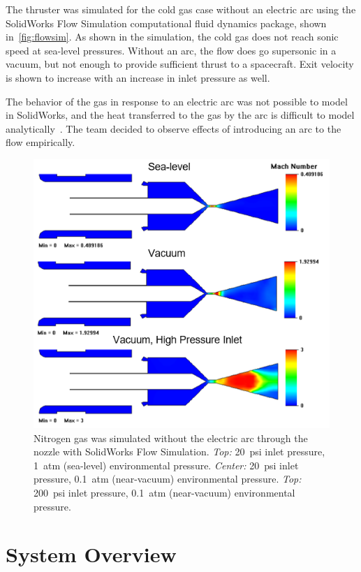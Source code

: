 \documentclass[conference]{IEEEtran}
\begin{document}
The thruster was simulated for the cold gas case without an electric arc using the SolidWorks Flow Simulation computational fluid dynamics package, shown in~\autoref{fig:flowsim}.
As shown in the simulation, the cold gas does not reach sonic speed at sea-level pressures.
Without an arc, the flow does go supersonic in a vacuum, but not enough to provide sufficient thrust to a spacecraft.
Exit velocity is shown to increase with an increase in inlet pressure as well.

The behavior of the gas in response to an electric arc was not possible to model in SolidWorks, and the heat transferred to the gas by the arc is difficult to model analytically~\cite{mitarcjets}.
The team decided to observe effects of introducing an arc to the flow empirically.

\begin{figure}
  \includegraphics[width=\linewidth]{figs/flowsim}
  \caption{Nitrogen gas was simulated without the electric arc through the nozzle with SolidWorks Flow Simulation.
  \emph{Top: }\SI{20}{psi} inlet pressure, \SI{1}{atm} (sea-level) environmental pressure.
  \emph{Center: }\SI{20}{psi} inlet pressure, \SI{0.1}{atm} (near-vacuum) environmental pressure.
  \emph{Top: }\SI{200}{psi} inlet pressure, \SI{0.1}{atm} (near-vacuum) environmental pressure.}
\label{fig:flowsim}
\end{figure}

\section{System Overview}
\end{document}
